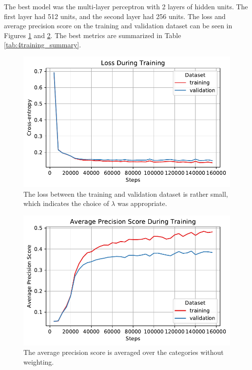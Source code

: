 The best model was the multi-layer perceptron with 2 layers of hidden units. The
first layer had 512 units, and the second layer had 256 units. The loss and
average precision score on the training and validation dataset can be seen in
Figures \ref{fig:4loss} and \ref{fig:4average_precision_score}. The best metrics
are summarized in Table \ref{tab:4training_summary}.

\begin{figure}
  \centering
  \includegraphics{problem4/loss.pdf}
  \caption{The loss between the training and validation dataset is rather small,
    which indicates the choice of $\lambda$ was appropriate.}
  \label{fig:4loss}
\end{figure}

\begin{figure}
  \centering
  \includegraphics{problem4/average_precision_score.pdf}
  \caption{The average precision score is averaged over the categories without
    weighting.}
  \label{fig:4average_precision_score}
\end{figure}

